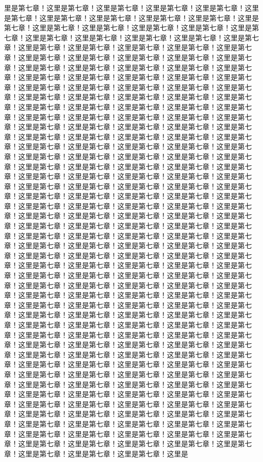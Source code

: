 里是第七章！这里是第七章！这里是第七章！这里是第七章！这里是第七章！这里是第七章！这里是第七章！这里是第七章！这里是第七章！这里是第七章！这里是第七章！这里是第七章！这里是第七章！这里是第七章！这里是第七章！这里是第七章！这里是第七章！这里是第七章！这里是第七章！这里是第七章！这里是第七章！这里是第七章！这里是第七章！这里是第七章！这里是第七章！这里是第七章！这里是第七章！这里是第七章！这里是第七章！这里是第七章！这里是第七章！这里是第七章！这里是第七章！这里是第七章！这里是第七章！这里是第七章！这里是第七章！这里是第七章！这里是第七章！这里是第七章！这里是第七章！这里是第七章！这里是第七章！这里是第七章！这里是第七章！这里是第七章！这里是第七章！这里是第七章！这里是第七章！这里是第七章！这里是第七章！这里是第七章！这里是第七章！这里是第七章！这里是第七章！这里是第七章！这里是第七章！这里是第七章！这里是第七章！这里是第七章！这里是第七章！这里是第七章！这里是第七章！这里是第七章！这里是第七章！这里是第七章！这里是第七章！这里是第七章！这里是第七章！这里是第七章！这里是第七章！这里是第七章！这里是第七章！这里是第七章！这里是第七章！这里是第七章！这里是第七章！这里是第七章！这里是第七章！这里是第七章！这里是第七章！这里是第七章！这里是第七章！这里是第七章！这里是第七章！这里是第七章！这里是第七章！这里是第七章！这里是第七章！这里是第七章！这里是第七章！这里是第七章！这里是第七章！这里是第七章！这里是第七章！这里是第七章！这里是第七章！这里是第七章！这里是第七章！这里是第七章！这里是第七章！这里是第七章！这里是第七章！这里是第七章！这里是第七章！这里是第七章！这里是第七章！这里是第七章！这里是第七章！这里是第七章！这里是第七章！这里是第七章！这里是第七章！这里是第七章！这里是第七章！这里是第七章！这里是第七章！这里是第七章！这里是第七章！这里是第七章！这里是第七章！这里是第七章！这里是第七章！这里是第七章！这里是第七章！这里是第七章！这里是第七章！这里是第七章！这里是第七章！这里是第七章！这里是第七章！这里是第七章！这里是第七章！这里是第七章！这里是第七章！这里是第七章！这里是第七章！这里是第七章！这里是第七章！这里是第七章！这里是第七章！这里是第七章！这里是第七章！这里是第七章！这里是第七章！这里是第七章！这里是第七章！这里是第七章！这里是第七章！这里是第七章！这里是第七章！这里是第七章！这里是第七章！这里是第七章！这里是第七章！这里是第七章！这里是第七章！这里是第七章！这里是第七章！这里是第七章！这里是第七章！这里是第七章！这里是第七章！这里是第七章！这里是第七章！这里是第七章！这里是第七章！这里是第七章！这里是第七章！这里是第七章！这里是第七章！这里是第七章！这里是第七章！这里是第七章！这里是第七章！这里是第七章！这里是第七章！这里是第七章！这里是第七章！这里是第七章！这里是第七章！这里是第七章！这里是第七章！这里是第七章！这里是第七章！这里是第七章！这里是第七章！这里是第七章！这里是第七章！这里是第七章！这里是第七章！这里是第七章！这里是第七章！这里是第七章！这里是第七章！这里是第七章！这里是第七章！这里是第七章！这里是第七章！这里是第七章！这里是第七章！这里是第七章！这里是第七章！这里是第七章！这里是第七章！这里是第七章！这里是第七章！这里是第七章！这里是第七章！这里是第七章！这里是第七章！这里是第七章！这里是第七章！这里是第七章！这里是第七章！这里是第七章！这里是第七章！这里是第七章！这里是第七章！这里是第七章！这里是第七章！这里是第七章！这里是第七章！这里是第七章！这里是第七章！这里是第七章！这里是第七章！这里是第七章！这里是第七章！这里是